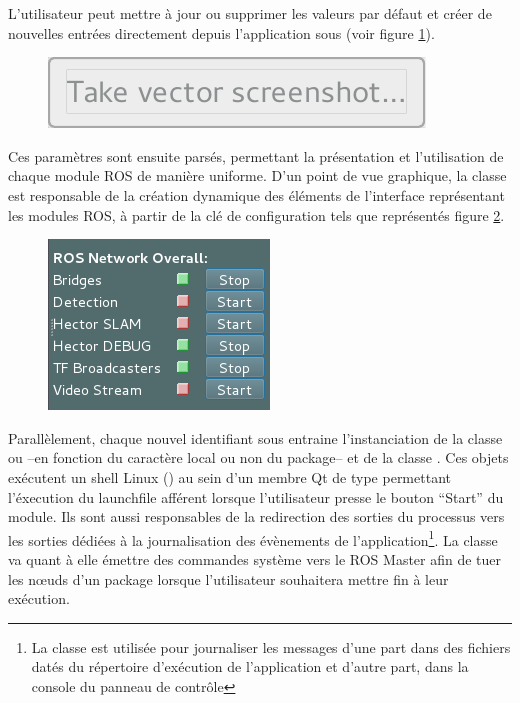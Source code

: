 L'utilisateur peut mettre à jour ou supprimer les valeurs par défaut et créer de nouvelles entrées directement depuis l'application sous  (voir figure \ref{fig:settings}).

\begin{figure}[h]
  \centering
    \includegraphics[width=.7\linewidth]{figures/settings}  
  \label{fig:settings}
\end{figure}

Ces paramètres sont ensuite parsés, permettant la présentation et l'utilisation de chaque module ROS de manière uniforme.
D'un point de vue graphique, la classe  est responsable de la création dynamique des éléments de l'interface représentant les modules ROS, à partir de la clé de configuration  
tels que représentés figure \ref{fig:guicontrols}.

\begin{figure}
  \centering
    \includegraphics[width=.3\linewidth]{figures/guicontrols}  
  \label{fig:guicontrols}
\end{figure}

Parallèlement, chaque nouvel identifiant sous  entraine l'instanciation de la classe  ou  --en fonction du caractère local ou non du package-- et de la classe 
. 
Ces objets exécutent un shell Linux () au sein d'un membre Qt de type  permettant l'éxecution du launchfile afférent lorsque l'utilisateur presse le bouton ``Start'' du module.
Ils sont aussi responsables de la redirection des sorties du processus vers les sorties dédiées à la journalisation des évènements de l'application\footnote{La classe  est utilisée pour journaliser les messages d'une part dans des fichiers datés du répertoire d'exécution 
de l'application et d'autre part, dans la console du panneau de contrôle}. 
La classe  va quant à elle émettre des commandes système vers le ROS Master afin de tuer les n\oe{}uds d'un package lorsque l'utilisateur souhaitera mettre fin à leur exécution. 

